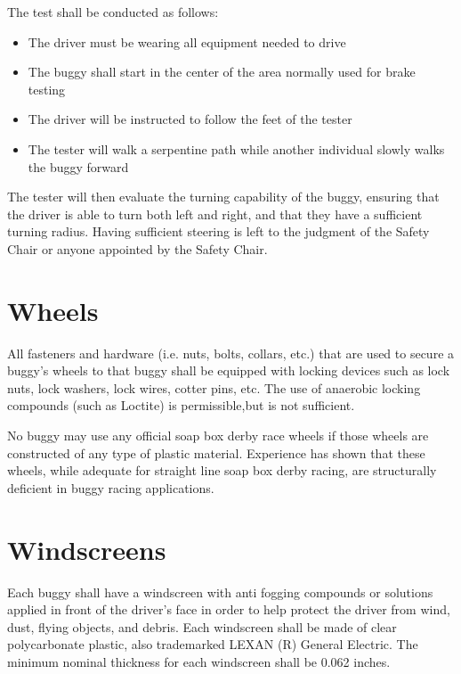 The test shall be conducted as follows: 
\begin{itemize}
	\item	
	The driver must be wearing all equipment needed to drive

	\item
	The buggy shall start in the center of the area normally used for brake testing
	
	\item
	The driver will be instructed to follow the feet of the tester

	\item
	The tester will walk a serpentine path while another individual slowly walks the buggy forward
\end{itemize}

The tester will then evaluate the turning capability of the buggy, ensuring that the driver is able to turn both left and right, and that they have a sufficient turning radius. Having sufficient steering is left to the judgment of the Safety Chair or anyone appointed by the Safety Chair. 


\section{Wheels}

	All fasteners and hardware (i.e. nuts, bolts, collars, etc.) that are used to secure a buggy's wheels to that buggy shall be equipped with locking devices such as lock nuts, lock washers, lock wires, cotter pins, etc. The use of anaerobic locking compounds (such as Loctite) is permissible,but is not sufficient.

	No buggy may use any official soap box derby race wheels if those wheels are constructed of any type of plastic material. Experience has shown that these wheels, while adequate for straight line soap box derby racing, are structurally deficient in buggy racing applications.

\section{Windscreens}

	Each buggy shall have a windscreen with anti fogging compounds or solutions applied in front of the driver's face in order to help protect the driver from wind, dust, flying objects, and debris. Each windscreen shall be made of clear polycarbonate plastic, also trademarked LEXAN (R) General Electric. The minimum nominal thickness for each windscreen shall be 0.062 inches.
	
